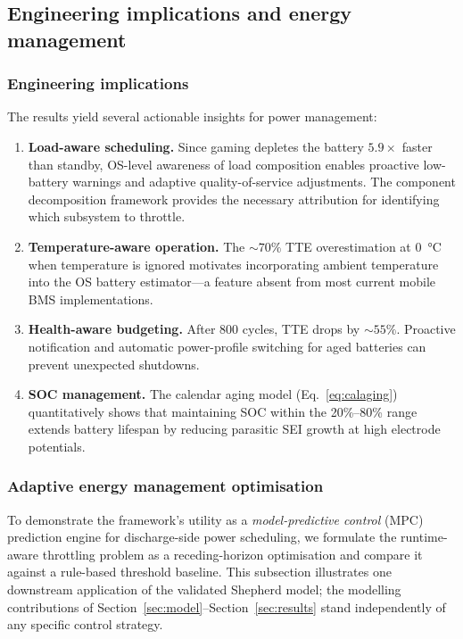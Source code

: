 \documentclass[5p,times,number]{elsarticle}
\newcommand{\secref}[1]{\hyperref[#1]{\textup{Section~\ref*{#1}}}}
\newcommand{\eqnrefp}[1]{\hyperref[#1]{\textup{Eq.~\ref*{#1}}}}
\def\secref#1{Section~\ref{#1}}
\def\eqnrefp#1{Eq.~\ref{#1}}
\begin{document}
\subsection{Engineering implications and energy management}\label{sec:eng_mgmt}
\subsubsection{Engineering implications}\label{sec:engineering}
The results yield several actionable insights for power management:
\begin{enumerate}[leftmargin=*, label=(\roman*)]
    \item \textbf{Load-aware scheduling.}
    Since gaming depletes the battery $5.9\times$ faster than standby, OS-level awareness of load composition enables proactive low-battery warnings and adaptive quality-of-service adjustments.
    The component decomposition framework provides the necessary attribution for identifying which subsystem to throttle.
    \item \textbf{Temperature-aware operation.}
    The $\sim 70\%$ TTE overestimation at \SI{0}{\degreeCelsius} when temperature is ignored motivates incorporating ambient temperature into the OS battery estimator---a feature absent from most current mobile BMS implementations.
    \item \textbf{Health-aware budgeting.}
    After 800 cycles, TTE drops by $\sim 55\%$.
    Proactive notification and automatic power-profile switching for aged batteries can prevent unexpected shutdowns.
    \item \textbf{SOC management.}
    The calendar aging model (\eqnrefp{eq:calaging}) quantitatively shows that maintaining SOC within the 20\%--80\% range extends battery lifespan by reducing parasitic SEI growth at high electrode potentials.
\end{enumerate}



\subsubsection{Adaptive energy management optimisation}\label{sec:energy_mgmt}
To demonstrate the framework's utility as a \emph{model-predictive control} (MPC) prediction engine for discharge-side power scheduling, we formulate the runtime-aware throttling problem as a receding-horizon optimisation and compare it against a rule-based threshold baseline.
This subsection illustrates one downstream application of the validated Shepherd model; the modelling contributions of \secref{sec:model}--\secref{sec:results} stand independently of any specific control strategy.
\end{document}
